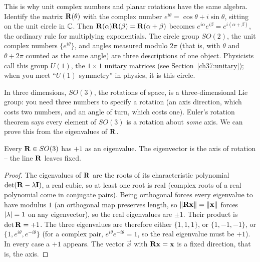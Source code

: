 \begin{connectionbox}
This is why unit complex numbers and planar rotations have the same algebra. Identify
the matrix $\mathbf{R}(\theta)$ with the complex number $e^{i\theta} = \cos\theta +
i\sin\theta$, sitting on the unit circle in $\mathbb{C}$. Then $\mathbf{R}(\alpha)\mathbf{R}(\beta)
= \mathbf{R}(\alpha+\beta)$ becomes $e^{i\alpha}e^{i\beta} = e^{i(\alpha+\beta)}$, the
ordinary rule for multiplying exponentials. The circle group $SO(2)$, the unit
complex numbers $\{e^{i\theta}\}$, and angles measured modulo $2\pi$ (that is, with
$\theta$ and $\theta+2\pi$ counted as the same angle) are three descriptions of
one object. Physicists call this group $U(1)$, the $1\times 1$ unitary matrices
(see Section~\ref{ch37:unitary}); when you meet ``$U(1)$ symmetry'' in physics, it
is this circle.
\end{connectionbox}

In three dimensions, $SO(3)$, the rotations
of space, is a three-dimensional Lie group: you need three numbers to specify a
rotation (an axis direction, which costs two numbers, and an angle of turn, which
costs one). Euler's rotation theorem says every element of $SO(3)$ is a
rotation about \emph{some} axis. We can prove this from the eigenvalues of $\mathbf{R}$.

\begin{proposition}
\label{ch37:prop-euler}
Every $\mathbf{R}\in SO(3)$ has $+1$ as an eigenvalue. The eigenvector is the axis of
rotation -- the line $\mathbf{R}$ leaves fixed.
\end{proposition}

\begin{proof}
The eigenvalues of $\mathbf{R}$ are the roots of its characteristic polynomial
$\det(\mathbf{R}-\lambda\mathbf{I})$, a real cubic, so at least one root is real (complex
roots of a real polynomial come in conjugate pairs). Being orthogonal forces every
eigenvalue to have modulus $1$ (an orthogonal map preserves length, so
$\lVert\mathbf{R}\mathbf{x}\rVert=\lVert\mathbf{x}\rVert$ forces $\lvert\lambda\rvert=1$ on any eigenvector),
so the real eigenvalues are $\pm 1$. Their product is $\det\mathbf{R}=+1$. The three
eigenvalues are therefore
either $\{1,1,1\}$, or $\{1,-1,-1\}$, or $\{1, e^{i\theta}, e^{-i\theta}\}$ (for a
complex pair, $e^{i\theta}e^{-i\theta}=1$, so the real eigenvalue must be $+1$). In
every case a $+1$ appears. The vector $\vec{x}$ with $\mathbf{R}\mathbf{x}=\mathbf{x}$ is a
fixed direction, that is, the axis.
\end{proof}

